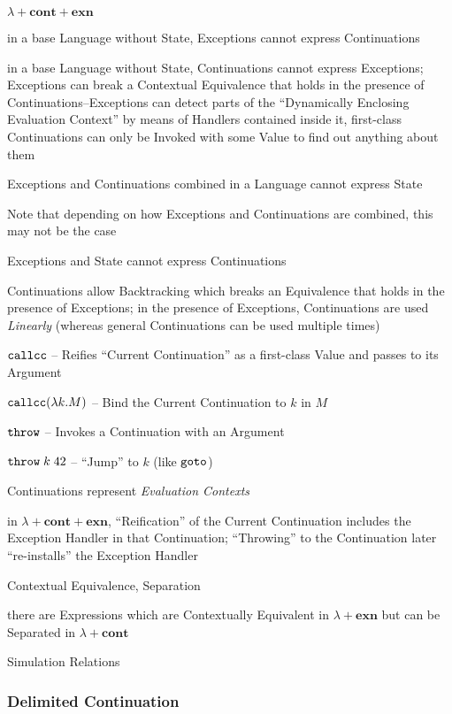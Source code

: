 $\lambda + \mathbf{cont} + \mathbf{exn}$

in a base Language without State, Exceptions cannot express
Continuations

in a base Language without State, Continuations cannot express
Exceptions; Exceptions can break a Contextual Equivalence that holds
in the presence of Continuations--Exceptions can detect parts of the
``Dynamically Enclosing Evaluation Context'' by means of Handlers
contained inside it, first-class Continuations can only be Invoked
with some Value to find out anything about them

Exceptions and Continuations combined in a Language cannot express
State

\fist Note that depending on how Exceptions and Continuations are
combined, this may not be the case

Exceptions and State cannot express Continuations

Continuations allow Backtracking which breaks an Equivalence that
holds in the presence of Exceptions; in the presence of Exceptions,
Continuations are used \emph{Linearly} (whereas general Continuations
can be used multiple times)

$\mathtt{callcc}$ -- Reifies ``Current Continuation'' as a first-class Value
and passes to its Argument %

$\mathtt{callcc}(\lambda k.M)$ -- Bind the Current Continuation to $k$ in $M$

$\mathtt{throw}$ -- Invokes a Continuation with an Argument

$\mathtt{throw}\;k\;42$ -- ``Jump'' to $k$ (like $\mathtt{goto}$)

Continuations represent \emph{Evaluation Contexts}

in $\lambda + \mathbf{cont} + \mathbf{exn}$, ``Reification'' of the
Current Continuation includes the Exception Handler in that
Continuation; ``Throwing'' to the Continuation later ``re-installs''
the Exception Handler

Contextual Equivalence, Separation %

there are Expressions which are Contextually Equivalent in $\lambda +
\mathbf{exn}$ but can be Separated in $\lambda + \mathbf{cont}$

Simulation Relations



\subsubsection{Delimited Continuation}\label{sec:delimited_continuation}

